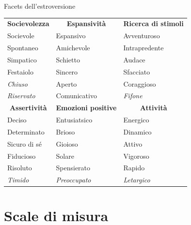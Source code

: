\documentclass[compress]{beamer}
\begin{document}
\begin{frame}{Facets dell'estroversione}
	\begin{table}
			\begin{tabular}{l l l}
			\multicolumn{1}{c}{\textbf{Socievolezza}}	&	\multicolumn{1}{c}{\textbf{Espansività}}	&	\multicolumn{1}{c}{\textbf{Ricerca di stimoli}}	\\
			Socievole	&	Espansivo	&	Avventuroso	\\
			Spontaneo	&	Amichevole	&	Intrapredente	\\
			Simpatico	&	Schietto	&	Audace	\\
			Festaiolo	&	Sincero	&	Sfacciato	\\
			\emph{Chiuso}	&	Aperto	&	Coraggioso	\\
			\emph{Riservato}	&	Comunicativo	&	\emph{Fifone}	\\
			\multicolumn{1}{c}{\textbf{Assertività}}	&	\multicolumn{1}{c}{\textbf{Emozioni positive}}	&	\multicolumn{1}{c}{\textbf{Attività}}	\\
			Deciso	&	Entusiatsico	&	Energico	\\
			Determinato	&	Brioso	&	Dinamico	\\
			Sicuro di sé	&	Gioioso	&	Attivo	\\
			Fiducioso	&	Solare	&	Vigoroso	\\
			Risoluto	&	Spensierato	&	Rapido	\\
			\emph{Timido}	&	\emph{Preoccupato}	&	\emph{Letargico}	\\
			
			
		\end{tabular}
	\end{table}

\end{frame}

\section[Scale di misura]{Scale di misura}
\end{document}
